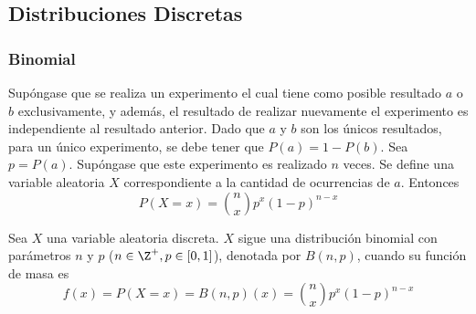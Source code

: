 \subsection{Distribuciones Discretas}
\subsubsection{Binomial}
\label{dist:binom}
Supóngase que se realiza un experimento el cual tiene como posible
resultado $a$ o $b$ exclusivamente, y además, el resultado
de realizar nuevamente el experimento es independiente al
resultado anterior. Dado que $a$ y $b$ son los únicos resultados,
para un único experimento, se debe tener que
$P(a) = 1 - P(b)$. Sea $p=P(a)$. Supóngase que
este experimento es realizado $n$ veces. Se define una variable
aleatoria $X$ correspondiente a la cantidad de ocurrencias de $a$.
Entonces
\[P(X=x) = \binom{n}{x}p^x(1-p)^{n-x}\]  
\begin{Def}
  Sea $X$ una variable aleatoria discreta. $X$ sigue una distribución
  binomial con parámetros $n$ y $p$ ($n\in\Z^+, p\in[0,1]$), denotada por $B(n,p)$,
  cuando su función de masa es
  \[f(x) = P(X=x) = B(n,p)(x) = \binom{n}{x}p^x(1-p)^{n-x}\]
\end{Def}

